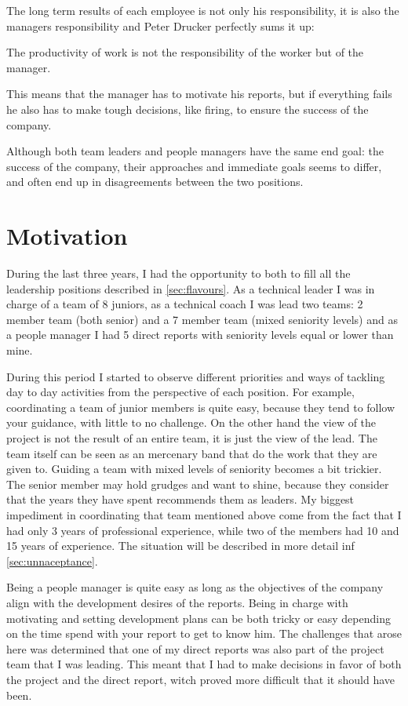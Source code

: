 The long term results of each employee is not only his responsibility, it is also the managers responsibility and Peter Drucker perfectly sums it up:
\begin{displayquote}
The productivity of work is not the responsibility of the worker but of the manager.
\end{displayquote}
This means that the manager has to motivate his reports, but if everything fails he also has to make tough decisions, like firing, to ensure the success of the company.

Although both team leaders and people managers have the same end goal: the success of the company, their approaches and immediate goals seems to differ, and often end up in disagreements between the two positions.
 
\section{Motivation}
\label{sec:motivation}
During the last three years, I had the opportunity to both to fill all the leadership positions described in \ref{sec:flavours}. As a technical leader I was in charge of a team of 8 juniors, as a technical coach I was lead two teams: 2 member team (both senior) and a 7 member team (mixed seniority levels) and as a people manager I had 5 direct reports with seniority levels equal or lower than mine. 

During this period I started to observe different priorities and ways of tackling day to day activities from the perspective of each position. For example, coordinating a team of junior members is quite easy, because they tend to follow your guidance, with little to no challenge. On the other hand the view of the project is not the result of an entire team, it is just the view of the lead. The team itself can be seen as an mercenary band that do the work that they are given to.
Guiding a team with mixed levels of seniority becomes a bit trickier. The senior member may hold grudges and want to shine, because they consider that the years they have spent recommends them as leaders. My biggest impediment in coordinating that team mentioned above come from the fact that I had only 3 years of professional experience, while two of the members had 10 and 15 years of experience. The situation will be described in more detail inf \ref{sec:unnaceptance}.

Being a people manager is quite easy as long as the objectives of the company align with the development desires of the reports. Being in charge with motivating and setting development plans can be both tricky or easy depending on the time spend with your report to get to know him. The challenges that arose here was determined that one of my direct reports was also part of the project team that I was leading. This meant that I had to make decisions in favor of both the project and the direct report, witch proved more difficult that it should have been.


